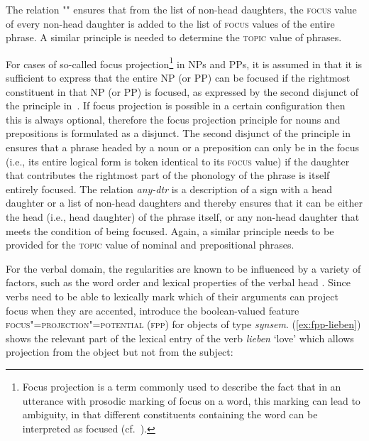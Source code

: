 \documentclass[output=paper,biblatex,babelshorthands,newtxmath,draftmode,colorlinks,citecolor=brown]{langscibook}
\begin{document}
The relation "" ensures that from the list of non-head daughters, the \textsc{focus} value of every non-head daughter is added to the list of \textsc{focus} values of the entire phrase.
A similar principle is needed to determine the \textsc{topic} value of
phrases.

For cases of so-called focus projection\footnote{Focus projection is a term commonly used to describe the fact that in an utterance with prosodic marking of focus on a word, this marking can lead to ambiguity, in that different constituents containing the word can be interpreted as focused (cf.\  \citealt{Gussenhoven83-u,Selkirk95a-u}).} in NPs and PPs, it is assumed
in \citet[169]{deKuthy2002a} that it is sufficient to express that the
entire NP (or PP) can be focused if the rightmost constituent in that
NP (or PP) is focused, as expressed by the second disjunct of the
principle in~.  If focus projection is
possible in a certain configuration then this is always optional,
therefore the focus projection principle for nouns and prepositions is
formulated as a disjunct. The second disjunct of the principle
in~ ensures that a phrase headed by a noun
or a preposition can only be in the focus (i.e., its entire logical
form is token identical to its \textsc{focus} value) if the daughter
that contributes the rightmost part of the phonology of the phrase is
itself entirely focused. The relation \textit{any-dtr} is a description of a sign with a head daughter or a list of non-head daughters and thereby
ensures that it can be either the head (i.e., head daughter) of the
phrase itself, or any non-head daughter that meets the
condition of being focused. Again, a similar principle needs to be provided for the
\textsc{topic} value of nominal and prepositional phrases.

For the verbal domain, the regularities are known to be influenced by
a variety of factors, such as the word order and lexical properties of
the verbal head \citep[cf., e.g., ][]{vSU86a}.  Since verbs
need to be able to lexically mark which of their arguments can project
focus when they are accented, \citet{dKM2003a} introduce the boolean-valued feature
\textsc{focus"=projection"=potential (fpp)} for objects of type
\textit{synsem}. (\ref{ex:fpp-lieben}) shows the relevant part
of the lexical entry of the verb \textit{lieben} `love' which allows
projection from the object but not from the subject:\pagebreak
\end{document}
